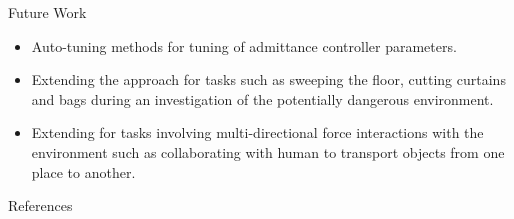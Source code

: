 \documentclass[aspectratio=169]{beamer}
\begin{document}
\begin{frame}{Future Work}
	\begin{minipage}[t]{0.51\textwidth}
		\begin{itemize}
			\small  
			\item Auto-tuning methods for tuning of admittance controller parameters.
			\item Extending the approach for tasks such as sweeping the floor, cutting curtains and bags during an investigation of the potentially dangerous environment.
		
		\end{itemize}
	\end{minipage}
	\hfill
	\begin{minipage}[t]{0.47\textwidth}
		\begin{itemize}
			\small 
			\item Extending  for tasks involving multi-directional force interactions with the environment such as collaborating with human to transport objects from one place to another.
		\end{itemize}
	\end{minipage}
\end{frame}

\begin{frame}[allowframebreaks]{References}
	
	
	
	
\end{frame}
\end{document}
